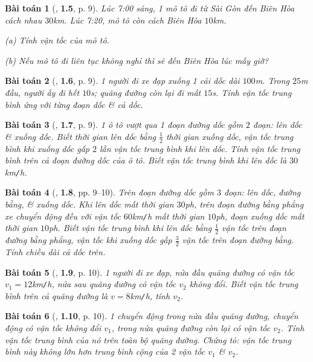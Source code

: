 \documentclass{article}
\numberwithin{equation}{section}
\newtheorem{baitoan}{Bài toán}[section]
\begin{document}
\begin{baitoan}[\cite{Van2022}, \textbf{1.5}, p. 9]
	Lúc 7:00 sáng, 1 mô tô đi từ Sài Gòn đến Biên Hòa cách nhau $30$\emph{km}. Lúc 7:20, mô tô còn cách Biên Hòa $10$\emph{km}.
	\begin{enumerate*}
		\item[(a)] Tính vận tốc của mô tô.
		\item[(b)] Nếu mô tô đi liên tục không nghỉ thì sẽ đến Biên Hòa lúc mấy giờ?
	\end{enumerate*}
\end{baitoan}

\begin{baitoan}[\cite{Van2022}, \textbf{1.6}, p. 9]
	1 người đi xe đạp xuống 1 cái dốc dài $100$\emph{m}. Trong $25$\emph{m} đầu, người ấy đi hết $10$\emph{s}; quãng đường còn lại đi mất $15$\emph{s}. Tính vận tốc trung bình ứng với từng đoạn dốc \& cả dốc.
\end{baitoan}

\begin{baitoan}[\cite{Van2022}, \textbf{1.7}, p. 9]
	1 ô tô vượt qua 1 đoạn đường dốc gồm $2$ đoạn: lên dốc \& xuống dốc. Biết thời gian lên dốc bằng $\frac{1}{2}$ thời gian xuống dốc, vận tốc trung bình khi xuống dốc gấp $2$ lần vận tốc trung bình khi lên dốc. Tính vận tốc trung bình trên cả đoạn đường dốc của ô tô. Biết vận tốc trung bình khi lên dốc là $30$\emph{km\texttt{/}h}.
\end{baitoan}

\begin{baitoan}[\cite{Van2022}, \textbf{1.8}, pp. 9--10]
	Trên đoạn đường dốc gồm $3$ đoạn: lên dốc, đường bằng, \& xuống dốc. Khi lên dốc mất thời gian $30$\emph{ph}, trên đoạn đường bằng phẳng xe chuyển động đều với vận tốc $60$\emph{km\texttt{/}h} mất thời gian $10$\emph{ph}, đoạn xuống dốc mất thời gian $10$\emph{ph}. Biết vận tốc trung bình khi lên dốc bằng $\frac{1}{2}$ vận tốc trên đoạn đường bằng phẳng, vận tốc khi xuống dốc gấp $\frac{3}{2}$ vận tốc trên đoạn đường bằng. Tính chiều dài cả dốc trên.
\end{baitoan}

\begin{baitoan}[\cite{Van2022}, \textbf{1.9}, p. 10]
	1 người đi xe đạp, nửa đầu quãng đường có vận tốc $v_1 = 12$\emph{km\texttt{/}h}, nửa sau quãng đường có vận tốc $v_2$ không đổi. Biết vận tốc trung bình trên cả quãng đường là $v = 8$\emph{km\texttt{/}h}, tính $v_2$.
\end{baitoan}

\begin{baitoan}[\cite{Van2022}, \textbf{1.10}, p. 10]
	1 chuyển động trong nửa đầu quãng đường, chuyển động có vận tốc không đổi $v_1$, trong nửa quãng đường còn lại có vận tốc $v_2$. Tính vận tốc trung bình của nó trên toàn bộ quãng đường. Chứng tỏ: vận tốc trung bình này không lớn hơn trung bình cộng của 2 vận tốc $v_1$ \& $v_2$.
\end{baitoan}
\end{document}
